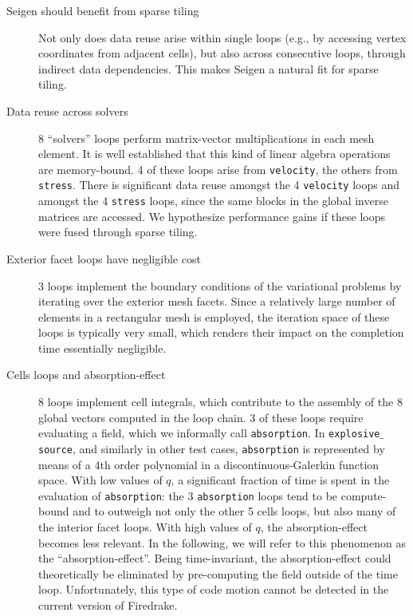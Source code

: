 \begin{description}
\item[Seigen should benefit from sparse tiling] Not only does data reuse arise within single loops (e.g., by accessing vertex coordinates from adjacent cells), but also across consecutive loops, through indirect data dependencies. This makes Seigen a natural fit for sparse tiling. 

\item[Data reuse across solvers] 8 ``solvers'' loops perform matrix-vector multiplications in each mesh element. It is well established that this kind of linear algebra operations are memory-bound. 4 of these loops arise from {\tt velocity}, the others from {\tt stress}. There is significant data reuse amongst the 4 {\tt velocity} loops and amongst the 4 {\tt stress} loops, since the same blocks in the global inverse matrices are accessed. We hypothesize performance gains if these loops were fused through sparse tiling.

\item[Exterior facet loops have negligible cost] 3 loops implement the boundary conditions of the variational problems by iterating over the exterior mesh facets. Since a relatively large number of elements in a rectangular mesh is employed, the iteration space of these loops is typically very small, which renders their impact on the completion time essentially negligible.

\item[Cells loops and absorption-effect] 8 loops implement cell integrals, which contribute to the assembly of the 8 global vectors computed in the loop chain. 3 of these loops require evaluating a field, which we informally call {\tt absorption}. In {\tt explosive$\_$source}, and similarly in other test cases, {\tt absorption} is represented by means of a 4th order polynomial in a discontinuous-Galerkin function space. With low values of $q$, a significant fraction of time is spent in the evaluation of {\tt absorption}: the 3 {\tt absorption} loops tend to be compute-bound and to outweigh not only the other 5 cells loops, but also many of the interior facet loops. With high values of $q$, the absorption-effect becomes less relevant. In the following, we will refer to this phenomenon as the ``absorption-effect''. Being time-invariant, the absorption-effect could theoretically be eliminated by pre-computing the field outside of the time loop. Unfortunately, this type of code motion cannot be detected in the current version of Firedrake. 


\end{description}
